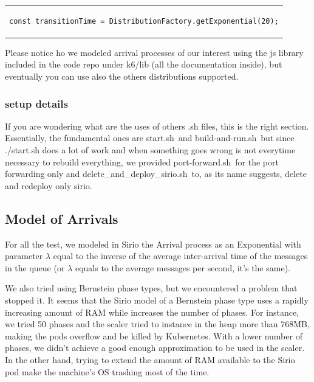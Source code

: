 \begin{table}[!htb]
\centering
\begin{tabular}{c}
\begin{lstlisting}
const transitionTime = DistributionFactory.getExponential(20);
\end{lstlisting}
\end{tabular}
\end{table}


Please notice ho we modeled arrival processes of our interest using the js library included in the code repo under k6/lib (all the documentation inside), but eventually you can use also the others distributions supported.

\subsubsection{setup details}

If you are wondering what are the uses of others .sh files, this is the right section. Essentially, the fundamental ones are \guillemotleft start.sh\guillemotright \ and \guillemotleft build-and-run.sh\guillemotright \ but since ./start.sh does a lot of work and when something goes wrong is not everytime necessary to rebuild everything, we provided \guillemotleft port-forward.sh\guillemotright \ for the port forwarding only and \guillemotleft delete\_and\_deploy\_sirio.sh\guillemotright \ to, as its name suggests, delete and redeploy only sirio.

\subsection{Model of Arrivals}
For all the test, we modeled in Sirio the Arrival process as an Exponential with parameter $\lambda$ equal to the inverse of the average inter-arrival time of the messages in the queue (or $\lambda$ equals to the average messages per second, it's the same). 

We also tried using Bernstein phase types, but we encountered a problem that stopped it. It seems that the Sirio model of a Bernstein phase type uses a rapidly increasing amount of RAM while increases the number of phases. For instance, we tried 50 phases and the scaler tried to instance in the heap more than 768MB, making the pods overflow and be killed by Kubernetes. With a lower number of phases, we didn't achieve a good enough approximation to be used in the scaler. In the other hand, trying to extend the amount of RAM available to the Sirio pod make the machine's OS trashing most of the time.

